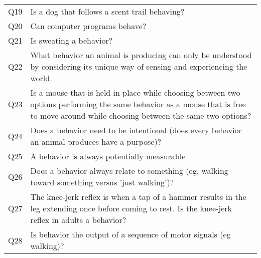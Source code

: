 \begin{tabular}{ll}
Q19                   &                                                                                                                                                              Is a dog that follows a scent trail behaving? \\
Q20                   &                                                                                                                                                                              Can computer programs behave? \\
Q21                   &                                                                                                                                                                                    Is sweating a behavior? \\
Q22                   &                                                                           What behavior an animal is producing can only be understood by considering its unique way of sensing and experiencing the world. \\
Q23                   &                       Is a mouse that is held in place while choosing between two options performing the same behavior as a mouse that is free to move around while choosing between the same two options? \\
Q24                   &                                                                                                            Does a behavior need to be intentional (does every behavior an animal produces have a purpose)? \\
Q25                   &                                                                                                                                                                A behavior is always potentially measurable \\
Q26                   &                                                                                                           Does a behavior always relate to something (eg, walking toward something versus 'just walking')? \\
Q27                   &                                                      The knee-jerk reflex is when a tap of a hammer results in the leg extending once before coming to rest. Is the knee-jerk reflex in adults a behavior? \\
Q28                   &                                                                                                                                        Is behavior the output of a sequence of motor signals (eg walking)? \\

\end{tabular}
